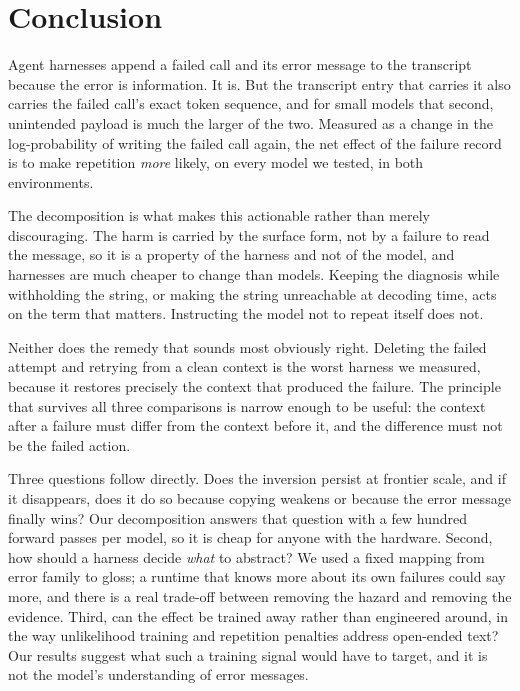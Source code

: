 \section{Conclusion}
\label{sec:conclusion}

Agent harnesses append a failed call and its error message to the transcript
because the error is information. It is. But the transcript entry that carries
it also carries the failed call's exact token sequence, and for small models
that second, unintended payload is much the larger of the two. Measured as a
change in the log-probability of writing the failed call again, the net effect
of the failure record is to make repetition \emph{more} likely, on every model
we tested, in both environments.

The decomposition is what makes this actionable rather than merely
discouraging. The harm is carried by the surface form, not by a failure to read
the message, so it is a property of the harness and not of the model, and harnesses are much
cheaper to change than models. Keeping the diagnosis while
withholding the string, or making the string unreachable at decoding time, acts
on the term that matters. Instructing the model not to repeat itself does not.

Neither does the remedy that sounds most obviously right. Deleting the failed
attempt and retrying from a clean context is the worst harness we measured,
because it restores precisely the context that produced the failure. The
principle that survives all three comparisons is narrow enough to be useful: the
context after a failure must differ from the context before it, and the
difference must not be the failed action.

Three questions follow directly. Does the inversion persist at frontier scale,
and if it disappears, does it do so because copying weakens or because the error
message finally wins? Our decomposition answers that question with a few hundred
forward passes per model, so it is cheap for anyone with the hardware. Second,
how should a harness decide \emph{what} to abstract? We used a fixed mapping from
error family to gloss; a runtime that knows more about its own failures could
say more, and there is a real trade-off between removing the hazard and removing
the evidence. Third, can the effect be trained away rather than engineered around, in the way
unlikelihood training and repetition penalties address open-ended text? Our results suggest what such a
training signal would have to target, and it is not the model's understanding of
error messages.
